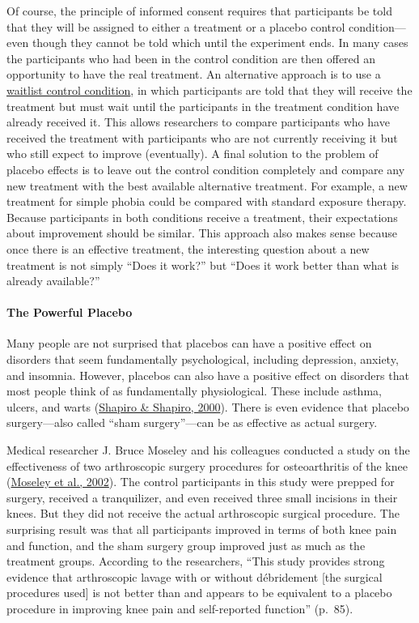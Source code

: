 \documentclass[
]{krantz}
\begin{document}
Of course, the principle of informed consent requires that participants be told that they will be assigned to either a treatment or a placebo control condition---even though they cannot be told which until the experiment ends. In many cases the participants who had been in the control condition are then offered an opportunity to have the real treatment. An alternative approach is to use a \protect\hyperlink{waitlist-control-condition}{waitlist control condition}, in which participants are told that they will receive the treatment but must wait until the participants in the treatment condition have already received it. This allows researchers to compare participants who have received the treatment with participants who are not currently receiving it but who still expect to improve (eventually). A final solution to the problem of placebo effects is to leave out the control condition completely and compare any new treatment with the best available alternative treatment. For example, a new treatment for simple phobia could be compared with standard exposure therapy. Because participants in both conditions receive a treatment, their expectations about improvement should be similar. This approach also makes sense because once there is an effective treatment, the interesting question about a new treatment is not simply ``Does it work?'' but ``Does it work better than what is already available?''

\hypertarget{the-powerful-placebo}{%
\paragraph*{The Powerful Placebo}\label{the-powerful-placebo}}

Many people are not surprised that placebos can have a positive effect on disorders that seem fundamentally psychological, including depression, anxiety, and insomnia. However, placebos can also have a positive effect on disorders that most people think of as fundamentally physiological. These include asthma, ulcers, and warts (\protect\hyperlink{ref-shapiro2000powerful}{Shapiro \& Shapiro, 2000}). There is even evidence that placebo surgery---also called ``sham surgery''---can be as effective as actual surgery.

Medical researcher J. Bruce Moseley and his colleagues conducted a study on the effectiveness of two arthroscopic surgery procedures for osteoarthritis of the knee (\protect\hyperlink{ref-moseley2002controlled}{Moseley et al., 2002}). The control participants in this study were prepped for surgery, received a tranquilizer, and even received three small incisions in their knees. But they did not receive the actual arthroscopic surgical procedure. The surprising result was that all participants improved in terms of both knee pain and function, and the sham surgery group improved just as much as the treatment groups. According to the researchers, ``This study provides strong evidence that arthroscopic lavage with or without débridement {[}the surgical procedures used{]} is not better than and appears to be equivalent to a placebo procedure in improving knee pain and self-reported function'' (p.~85).
\end{document}
